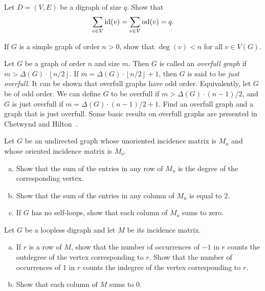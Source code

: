 \begin{problem}
\item Let $D = (V, E)$ be a digraph of size $q$. Show that
  \[
  \sum_{v \in V} \operatorname*{id}(v)
  =
  \sum_{v \in V} \operatorname*{od}(v)
  =
  q.
  \]

\item If $G$ is a simple graph of order $n > 0$, show that
  $\deg(v) < n$ for all $v \in V(G)$.

\item Let $G$ be a graph of order $n$ and size $m$. Then $G$ is called
  an \emph{overfull graph} if
  $m > \Delta(G) \cdot \left\lfloor n / 2 \right\rfloor$. If
  $m = \Delta(G) \cdot \left\lfloor n / 2 \right\rfloor + 1$, then $G$
  is said to be \emph{just overfull}. It can be shown that overfull
  graphs have odd order. Equivalently, let $G$ be of odd order. We can
  define $G$ to be overfull if $m > \Delta(G) \cdot (n-1)/2$,
  and $G$ is just overfull if $m = \Delta(G) \cdot (n-1)/2 + 1$. Find
  an overfull graph and a graph that is just overfull. Some basic
  results on overfull graphs are presented in Chetwynd and
  Hilton~\cite{ChetwyndHilton1986}.

\item Let $G$ be an undirected graph whose unoriented incidence matrix
  is $M_u$ and whose oriented incidence matrix is $M_o$.
  \begin{enumerate}[(a)]
  \item Show that the sum of the entries in any row of $M_u$ is the
    degree of the corresponding vertex.

  \item Show that the sum of the entries in any column of $M_u$ is
    equal to $2$.

  \item If $G$ has no self-loops, show that each column of $M_o$ sums
    to zero.
  \end{enumerate}

\item Let $G$ be a loopless digraph and let $M$ be its incidence
  matrix.
  \begin{enumerate}[(a)]
  \item If $r$ is a row of $M$, show that the number of occurrences of
    $-1$ in $r$ counts the outdegree of the vertex corresponding to
    $r$. Show that the number of occurrences of $1$ in $r$ counts the
    indegree of the vertex corresponding to $r$.

  \item Show that each column of $M$ sums to $0$.
  \end{enumerate}


\end{problem}

